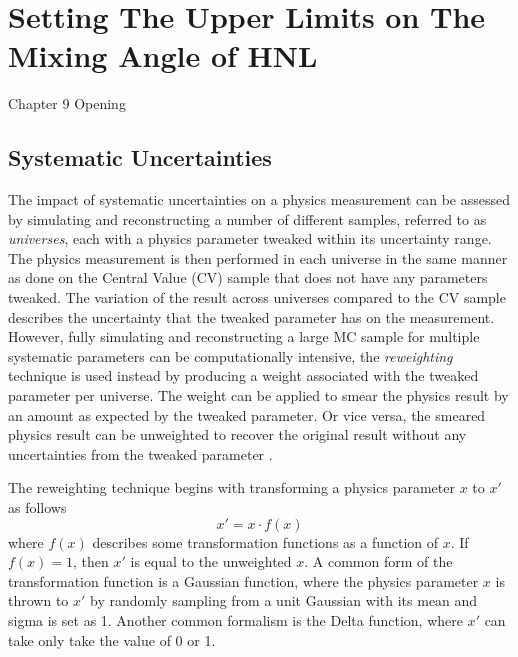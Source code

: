 \chapter{Setting The Upper Limits on The Mixing Angle of HNL}
\label{ChapterResult}

\ifpdf
    \graphicspath{{Chapter9/Figs/Raster/}{Chapter9/Figs/PDF/}{Chapter9/Figs/}}
\else
    \graphicspath{{Chapter9/Figs/Vector/}{Chapter9/Figs/}}
\fi


Chapter 9 Opening

\clearpage

\section{Systematic Uncertainties}

The impact of systematic uncertainties on a physics measurement can be assessed by simulating and reconstructing a number of different samples, referred to as \textit{universes}, each with a physics parameter tweaked within its uncertainty range.
The physics measurement is then performed in each universe in the same manner as done on the Central Value (CV) sample that does not have any parameters tweaked.
The variation of the result across universes compared to the CV sample describes the uncertainty that the tweaked parameter has on the measurement.
However, fully simulating and reconstructing a large MC sample for multiple systematic parameters can be computationally intensive, the \textit{reweighting} technique is used instead by producing a weight associated with the tweaked parameter per universe.
The weight can be applied to smear the physics result by an amount as expected by the tweaked parameter.
Or vice versa, the smeared physics result can be unweighted to recover the original result without any uncertainties from the tweaked parameter \cite{cowan_stat}.

The reweighting technique begins with transforming a physics parameter $x$ to $x'$ as follows
\begin{equation}
	x' = x \cdot f(x)
\end{equation}
where $f(x)$ describes some transformation functions as a function of $x$. 
If $f(x) = 1$, then $x'$ is equal to the unweighted $x$.
A common form of the transformation function  is a Gaussian function, where the physics parameter $x$ is thrown to $x'$ by randomly sampling from a unit Gaussian with its mean and sigma is set as 1.
Another common formalism is the Delta function, where $x'$ can take only take the value of 0 or 1. 

